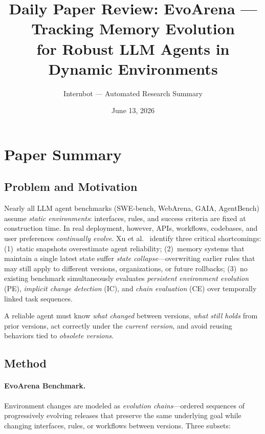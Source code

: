 \documentclass[11pt,a4paper]{article}
\title{Daily Paper Review: EvoArena --- Tracking Memory Evolution\\for Robust LLM Agents in Dynamic Environments}
\author{Internbot --- Automated Research Summary}
\date{June 13, 2026}
\begin{document}
\maketitle

\section{Paper Summary}

\subsection{Problem and Motivation}

Nearly all LLM agent benchmarks (SWE-bench, WebArena, GAIA, AgentBench) assume \emph{static environments}: interfaces, rules, and success criteria are fixed at construction time. In real deployment, however, APIs, workflows, codebases, and user preferences \emph{continually evolve}. Xu et al.~\cite{xu2026evoarena} identify three critical shortcomings: (1)~static snapshots overestimate agent reliability; (2)~memory systems that maintain a single latest state suffer \emph{state collapse}---overwriting earlier rules that may still apply to different versions, organizations, or future rollbacks; (3)~no existing benchmark simultaneously evaluates \emph{persistent environment evolution} (PE), \emph{implicit change detection} (IC), and \emph{chain evaluation} (CE) over temporally linked task sequences.

A reliable agent must know \emph{what changed} between versions, \emph{what still holds} from prior versions, act correctly under the \emph{current version}, and avoid reusing behaviors tied to \emph{obsolete versions}.

\subsection{Method}

\paragraph{EvoArena Benchmark.} Environment changes are modeled as \emph{evolution chains}---ordered sequences of progressively evolving releases that preserve the same underlying goal while changing interfaces, rules, or workflows between versions. Three subsets:
\end{document}
